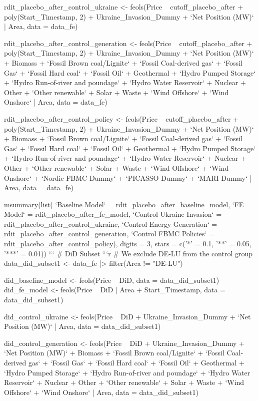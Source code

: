 rdit_placebo_after_control_ukraine <- feols(Price ~ cutoff_placebo_after + poly(Start_Timestamp, 2) + Ukraine_Invasion_Dummy + `Net Position (MW)` | Area, data = data_fe)

rdit_placebo_after_control_generation <- feols(Price ~ cutoff_placebo_after + poly(Start_Timestamp, 2) + Ukraine_Invasion_Dummy + `Net Position (MW)` + Biomass + `Fossil Brown coal/Lignite` + `Fossil Coal-derived gas` + `Fossil Gas` + `Fossil Hard coal` + `Fossil Oil` + Geothermal + `Hydro Pumped Storage` + `Hydro Run-of-river and poundage` + `Hydro Water Reservoir` + Nuclear + Other + `Other renewable` + Solar + Waste + `Wind Offshore` + `Wind Onshore` | Area, data = data_fe)

rdit_placebo_after_control_policy <- feols(Price ~ cutoff_placebo_after + poly(Start_Timestamp, 2) + Ukraine_Invasion_Dummy + `Net Position (MW)` + Biomass + `Fossil Brown coal/Lignite` + `Fossil Coal-derived gas` + `Fossil Gas` + `Fossil Hard coal` + `Fossil Oil` + Geothermal + `Hydro Pumped Storage` + `Hydro Run-of-river and poundage` + `Hydro Water Reservoir` + Nuclear + Other + `Other renewable` + Solar + Waste + `Wind Offshore` + `Wind Onshore` + `Nordic FBMC Dummy` + `PICASSO Dummy` + `MARI Dummy` | Area, data = data_fe)

msummary(list(
    `Baseline Model` = rdit_placebo_after_baseline_model,
    `FE Model` = rdit_placebo_after_fe_model,
    `Control Ukraine Invasion` = rdit_placebo_after_control_ukraine,
    `Control Energy Generation` = rdit_placebo_after_control_generation,
    `Control FBMC Policies` = rdit_placebo_after_control_policy),
  digits = 3,
  stars = c('*' = 0.1, '**' = 0.05, '***' = 0.01))
```
# DiD Subset
```{r}
# We exclude DE-LU from the control group
data_did_subset1 <- data_fe |>
  filter(Area != "DE-LU")

did_baseline_model <- feols(Price ~ DiD, data = data_did_subset1)
did_fe_model <- feols(Price ~ DiD | Area + Start_Timestamp, data = data_did_subset1)

did_control_ukraine <- feols(Price ~ DiD + Ukraine_Invasion_Dummy + `Net Position (MW)` | Area, data = data_did_subset1)

did_control_generation <- feols(Price ~ DiD + Ukraine_Invasion_Dummy + `Net Position (MW)` + Biomass + `Fossil Brown coal/Lignite` + `Fossil Coal-derived gas` + `Fossil Gas` + `Fossil Hard coal` + `Fossil Oil` + Geothermal + `Hydro Pumped Storage` + `Hydro Run-of-river and poundage` + `Hydro Water Reservoir` + Nuclear + Other + `Other renewable` + Solar + Waste + `Wind Offshore` + `Wind Onshore` | Area, data = data_did_subset1)

